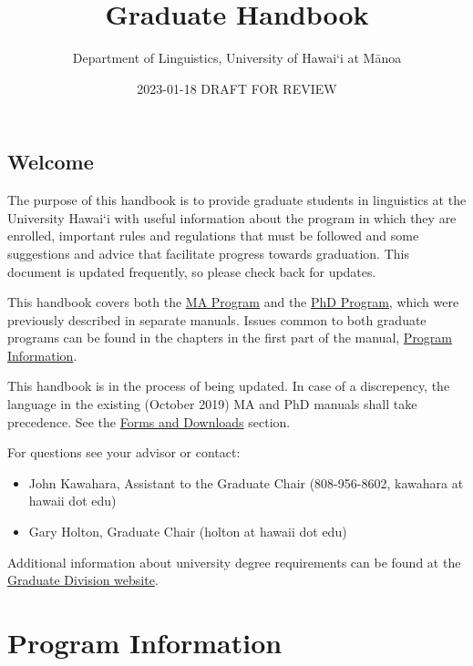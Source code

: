 \documentclass[
]{book}
\title{Graduate Handbook}
\author{Department of Linguistics, University of Hawai`i at Mānoa}
\date{2023-01-18 DRAFT FOR REVIEW}
\providecommand{\tightlist}{%
  \setlength{\itemsep}{0pt}\setlength{\parskip}{0pt}}
\begin{document}
\maketitle

{
\setcounter{tocdepth}{1}
\tableofcontents
}
\hypertarget{welcome}{%
\chapter*{Welcome}\label{welcome}}

The purpose of this handbook is to provide graduate students in linguistics at the University Hawai`i with useful information about the program in which they are enrolled, important rules and regulations that must be followed and some suggestions and advice that facilitate progress towards graduation. This document is updated frequently, so please check back for updates.

This handbook covers both the \protect\hyperlink{maprogram}{MA Program} and the \protect\hyperlink{phdprogram}{PhD Program}, which were previously described in separate manuals. Issues common to both graduate programs can be found in the chapters in the first part of the manual, \protect\hyperlink{general}{Program Information}.

This handbook is in the process of being updated. In case of a discrepency, the language in the existing (October 2019) MA and PhD manuals shall take precedence. See the \protect\hyperlink{forms}{Forms and Downloads} section.

For questions see your advisor or contact:

\begin{itemize}
\tightlist
\item
  John Kawahara, Assistant to the Graduate Chair (808-956-8602, kawahara at hawaii dot edu)
\item
  Gary Holton, Graduate Chair (holton at hawaii dot edu)
\end{itemize}

Additional information about university degree requirements can be found at the \href{https://manoa.hawaii.edu/graduate/current-students/}{Graduate Division website}.

\hypertarget{part-program-information}{%
\part*{Program Information}\label{part-program-information}}
\end{document}
